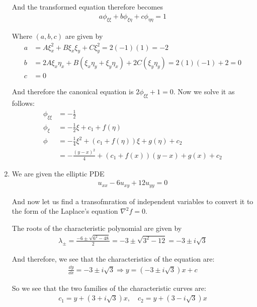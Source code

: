 \begin{enumerate}[label=(\roman*),leftmargin=*,itemsep=0mm]
    And the transformed equation therefore becomes
    \begin{align*}
        a\phi_{\xi\xi} + b\phi_{\xi\eta} + c\phi_{\eta\eta} = 1
    \end{align*}
    
    Where $(a,b,c)$ are given by
    \begin{align*}
        a &= A\xi_x^2 + B\xi_x\xi_y + C\xi_y^2 = 2(-1)(1) = -2 \\
        b &= 2A\xi_x\eta_x + B(\xi_x\eta_y + \xi_y\eta_x) + 2C(\xi_y\eta_y) = 2(1)(-1) + 2 = 0 \\
        c &= 0
    \end{align*}
    
    And therefore the canonical equation is $2\phi_{\xi\xi} + 1 = 0$.  Now we solve it as follows:
    \begin{align*}
        \phi_{\xi\xi} &= -\frac{1}{2} \\
        \phi_\xi &= -\frac{1}{2}\xi + c_1 + f(\eta) \\
        \phi &= -\frac{1}{4}\xi^2 + (c_1 + f(\eta))\xi + g(\eta) + c_2 \\
        &= -\frac{(y-x)^2}{4} + (c_1 + f(x))(y-x) + g(x) + c_2
    \end{align*}
    
    \item We are given the elliptic PDE
    \begin{align*}
        u_{xx} - 6u_{xy} + 12u_{yy} = 0
    \end{align*}
    
    And now let us find a transofmration of independent variables to convert it to the form of the Laplace's equation $\nabla^2f = 0$.
    
    The roots of the characteristic polynomial are given by
    \begin{align*}
        \lambda_{\pm} = \frac{-6 \pm \sqrt{6^2 - 48}}{2} = -3 \pm \sqrt{3^2-12} = -3\pm i\sqrt{3}
    \end{align*}
    
    And therefore, we see that the characteristics of the equation are:
    \begin{align*}
        \frac{\dd{y}}{\dd{x}} = -3\pm i\sqrt{3} \Rightarrow y = (-3\pm i\sqrt{3})x + c
    \end{align*}
    
    So we see that the two families of the characteristic curves are:
    \begin{align*}
        c_1 = y + (3+i\sqrt{3})x,\quad
        c_2 = y + (3-i\sqrt{3})x
    \end{align*}
    

\end{enumerate}
